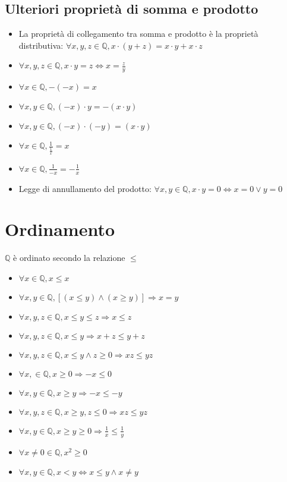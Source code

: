 \subsection{Ulteriori propriet\`a di somma e prodotto}
\begin{itemize}
\item La propriet\`a di collegamento tra somma e prodotto \`e la propriet\`a distributiva: $\forall x, y, z \in \mathbb{Q}, x\cdot(y + z)=x\cdot y+x\cdot z$
\item $\forall x, y, z \in \mathbb{Q}, x\cdot y=z \Leftrightarrow x=\frac{z}{y}$
\item $\forall x \in \mathbb{Q}, -(-x)=x$
\item $\forall x, y \in \mathbb{Q}, (-x)\cdot y=-(x \cdot y)$
\item $\forall x, y \in \mathbb{Q}, (-x)\cdot (-y)=(x \cdot y)$
\item $\forall x \in \mathbb{Q}, \frac{1}{\frac{1}{x}}=x$
\item $\forall x \in \mathbb{Q}, \frac{1}{-x}=-\frac{1}{x}$
\item Legge di annullamento del prodotto: $\forall x, y \in \mathbb{Q}, x\cdot y=0 \Leftrightarrow x=0 \lor y=0 $
\end{itemize}
\section{Ordinamento}
$\mathbb{Q}$ \`e ordinato secondo la relazione $\le$
\begin{itemize}
\item $\forall x\in \mathbb{Q}, x\le x$
\item $\forall x, y\in \mathbb{Q},[(x\le y)\wedge(x\ge y)] \Rightarrow x=y$
\item $\forall x, y, z\in \mathbb{Q}, x\le y\le z \Rightarrow x\le z$
\item $\forall x, y, z \in \mathbb{Q}, x\le y \Rightarrow x+z\le y+z$
\item $\forall x, y, z \in \mathbb{Q}, x\le y \wedge z\ge 0 \Rightarrow xz\le yz$
\item $\forall x, \in \mathbb{Q}, x\ge 0 \Rightarrow -x\le 0$
\item $\forall x, y\in \mathbb{Q}, x\ge y \Rightarrow -x\le -y$
\item $\forall x, y, z \in \mathbb{Q},x\ge y, z\le 0 \Rightarrow xz\le yz$
\item $\forall x, y \in \mathbb{Q}, x\ge y \ge 0 \Rightarrow \frac{1}{x}\le\frac{1}{y}$
\item $\forall x\ne 0 \in \mathbb{Q}, x^2\ge 0$
\item $\forall x, y \in \mathbb{Q}, x<y \Leftrightarrow x \le y \wedge x\ne y$
\end{itemize}

